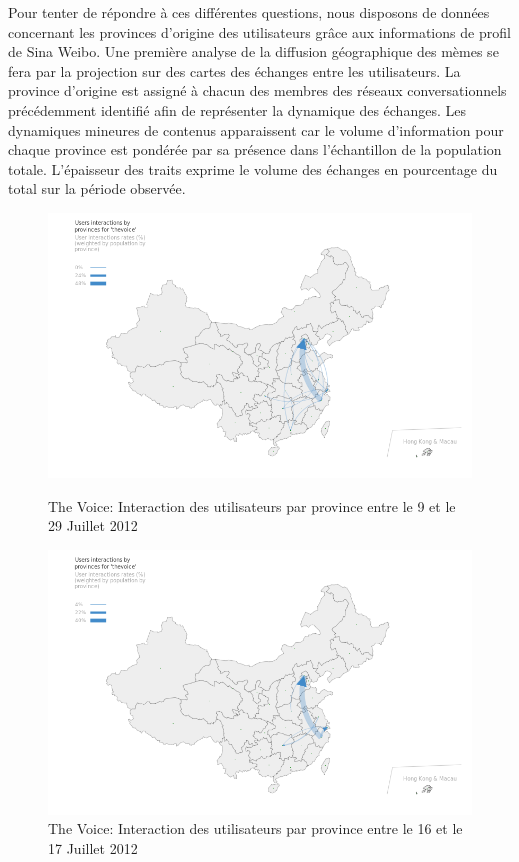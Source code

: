 Pour tenter de répondre \`a ces différentes questions, nous disposons de données concernant les provinces d{\textquoteright}origine des utilisateurs grâce aux informations de profil de Sina Weibo. Une première analyse de la diffusion géographique des mèmes se fera par la projection sur des cartes des échanges entre les utilisateurs. La province d'origine est assigné à chacun des membres des réseaux conversationnels précédemment identifié afin de représenter la dynamique des échanges. Les dynamiques mineures de contenus apparaissent car le volume d'information pour chaque province est pondérée par sa présence dans l'échantillon de la population totale. L{\textquoteright}épaisseur des traits exprime le volume des échanges en pourcentage du total sur la période observée.

\begin{figure}[h!]
  \begin{minipage}[c]{.45\linewidth}
    \centering
    \includegraphics[scale=.3]{figures/chap4/chapitre4-img19.png}
    \caption{
      The Voice: Interaction des utilisateurs par province entre le 9 et le 29 Juillet 2012
    }
    \label{fig:geo-voice-t1}
  \end{minipage}
  \begin{minipage}[c]{.45\linewidth}
    \centering
    \includegraphics[scale=.3]{figures/chap4/chapitre4-img20.png}    
    \caption{
      The Voice: Interaction des utilisateurs par province entre le 16 et le 17 Juillet 2012
    }
    \label{fig:geo-voice-t2}
  \end{minipage}
\end{figure}

